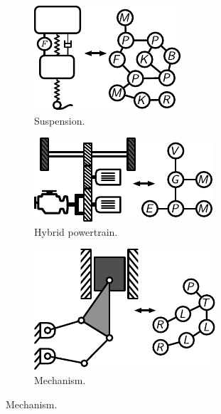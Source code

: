 \begin{figure}
\centering

\begin{subfigure}[b]{0.33\textwidth}
\centering
\includegraphics[scale=1]{../ch2/figures/suspension_optimized}
\caption{Suspension. \label{fig:ch2:initialexamples1}}
\end{subfigure}%
\begin{subfigure}[b]{0.33\textwidth}
\centering
\includegraphics[scale=1]{../ch2/figures/powertrain_optimized}
\caption{Hybrid powertrain. \label{fig:ch2:initialexamples2}}
\end{subfigure}%
\begin{subfigure}[b]{0.33\textwidth}
\centering
\includegraphics[scale=1]{../ch2/figures/linkage_optimized}
\caption{Mechanism. \label{fig:ch2:initialexamples3}}
\end{subfigure}

\vspace{0.05in}


\end{figure}
